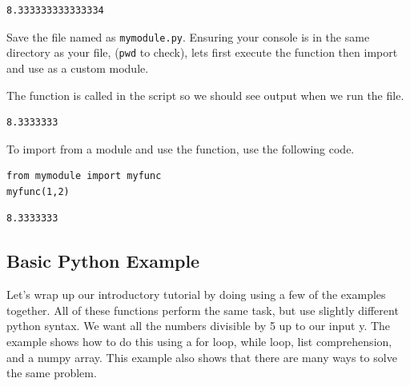 \documentclass[%
oneside,                 %
final,                   %
10pt]{article}
\begin{document}
\begin{verbatim}
8.333333333333334
\end{verbatim}

Save the file named as \texttt{mymodule.py}. Ensuring your console is in the same directory as your file, (\texttt{pwd} to check), lets first execute the function then import and use as a custom module.

The function is called in the script so we should see output when we run the file.
\begin{verbatim}
8.3333333
\end{verbatim}

To import from a module and use the function, use the following code.

\begin{verbatim}
from mymodule import myfunc
myfunc(1,2)
\end{verbatim}

\begin{verbatim}
8.3333333
\end{verbatim}

\subsection{Basic Python Example}

Let's wrap up our introductory tutorial by doing using a few of the examples together. All of these functions perform the same task, but use slightly different python syntax. We want all the numbers divisible by 5 up to our input y. The example shows how to do this using a for loop, while loop, list comprehension, and a numpy array. This example also shows that there are many ways to solve the same problem.
\end{document}
